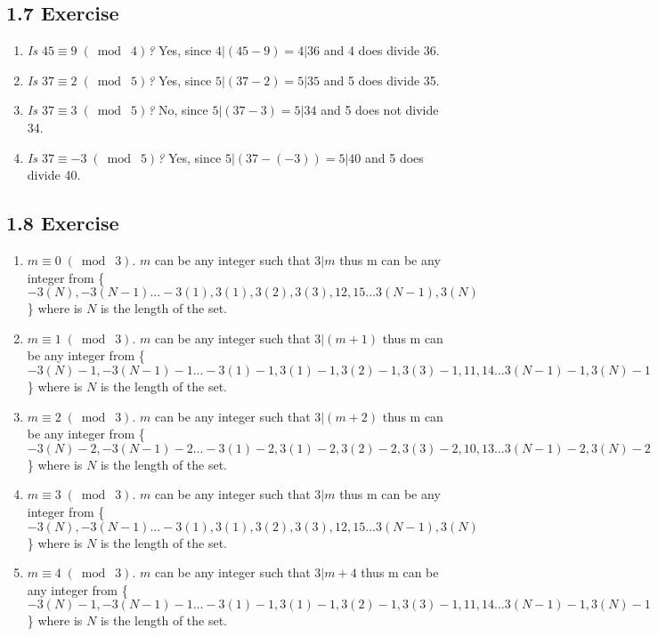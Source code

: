 \documentclass{article}
\begin{document}
\subsection*{1.7 Exercise} 
\begin{enumerate}
    \item \textit{Is $45 \equiv 9 \;(\bmod\; 4)$?}
    \newline Yes, since $4 \vert (45-9) = 4 \vert 36$ and 4 does divide 36.
    \item \textit{Is $37 \equiv 2 \;(\bmod\; 5)$?}
    \newline Yes, since $5 \vert (37-2) = 5 \vert 35$ and 5 does divide 35.
    \item \textit{Is $37 \equiv 3 \;(\bmod\; 5)$?}
    \newline No, since $5 \vert (37-3) = 5 \vert 34$ and 5 does not divide 34.
    \item \textit{Is $37 \equiv -3 \;(\bmod\; 5)$?}
    \newline Yes, since $5 \vert (37-(-3)) = 5 \vert 40$ and 5 does divide 40.
\end{enumerate}

\subsection*{1.8 Exercise} 
\begin{enumerate}
    \item $m \equiv 0 \;(\bmod\; 3)$.
    \newline $m$ can be any integer such that $3 \vert m$ thus m can be any integer from \{$-3(N), -3(N-1)...-3(1), 3(1),3(2),3(3),12,15...3(N-1), 3(N)$\} where is $N$ is the length of the set.
    \item $m \equiv 1 \;(\bmod\; 3)$.
    \newline $m$ can be any integer such that $3 \vert (m+1)$ thus m can be any integer from \{$-3(N)-1, -3(N-1)-1...-3(1)-1, 3(1)-1,3(2)-1,3(3)-1,11,14...3(N-1)-1, 3(N)-1$\} where is $N$ is the length of the set.
    \item $m \equiv 2 \;(\bmod\; 3)$.
    \newline $m$ can be any integer such that $3 \vert (m+2)$ thus m can be any integer from \{$-3(N)-2, -3(N-1)-2...-3(1)-2, 3(1)-2,3(2)-2,3(3)-2,10,13...3(N-1)-2, 3(N)-2$\} where is $N$ is the length of the set.
    \item $m \equiv 3 \;(\bmod\; 3)$.
    \newline $m$ can be any integer such that $3 \vert m$ thus m can be any integer from \{$-3(N), -3(N-1)...-3(1), 3(1),3(2),3(3),12,15...3(N-1), 3(N)$\} where is $N$ is the length of the set.
    \item $m \equiv 4 \;(\bmod\; 3)$.
    \newline $m$ can be any integer such that $3 \vert m+4$ thus m can be any integer from \{$-3(N)-1, -3(N-1)-1...-3(1)-1, 3(1)-1,3(2)-1,3(3)-1,11,14...3(N-1)-1, 3(N)-1$\} where is $N$ is the length of the set.
\end{enumerate}
\end{document}
